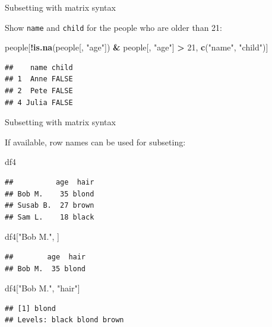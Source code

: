 \documentclass[ignorenonframetext,]{beamer}
\newenvironment{Shaded}{\begin{snugshade}}{\end{snugshade}}
\newcommand{\DecValTok}[1]{\textcolor[rgb]{0.00,0.00,0.81}{#1}}
\newcommand{\KeywordTok}[1]{\textcolor[rgb]{0.13,0.29,0.53}{\textbf{#1}}}
\newcommand{\NormalTok}[1]{#1}
\newcommand{\OperatorTok}[1]{\textcolor[rgb]{0.81,0.36,0.00}{\textbf{#1}}}
\newcommand{\StringTok}[1]{\textcolor[rgb]{0.31,0.60,0.02}{#1}}
\begin{document}
\begin{frame}[fragile]{Subsetting with matrix syntax}
\protect\hypertarget{subsetting-with-matrix-syntax-5}{}

Show \texttt{name} and \texttt{child} for the people who are older than
21:

\begin{Shaded}
\begin{Highlighting}[]
\NormalTok{people[}\OperatorTok{!}\KeywordTok{is.na}\NormalTok{(people[, }\StringTok{"age"}\NormalTok{]) }\OperatorTok{&}\StringTok{ }\NormalTok{people[, }\StringTok{"age"}\NormalTok{] }\OperatorTok{>}\StringTok{ }\DecValTok{21}\NormalTok{,}
       \KeywordTok{c}\NormalTok{(}\StringTok{"name"}\NormalTok{, }\StringTok{"child"}\NormalTok{)]}
\end{Highlighting}
\end{Shaded}

\begin{verbatim}
##    name child
## 1  Anne FALSE
## 2  Pete FALSE
## 4 Julia FALSE
\end{verbatim}

\end{frame}

\begin{frame}[fragile]{Subsetting with matrix syntax}
\protect\hypertarget{subsetting-with-matrix-syntax-6}{}

If available, row names can be used for subseting:

\begin{Shaded}
\begin{Highlighting}[]
\NormalTok{df4}
\end{Highlighting}
\end{Shaded}

\begin{verbatim}
##          age  hair
## Bob M.    35 blond
## Susab B.  27 brown
## Sam L.    18 black
\end{verbatim}

\begin{Shaded}
\begin{Highlighting}[]
\NormalTok{df4[}\StringTok{"Bob M."}\NormalTok{, ]}
\end{Highlighting}
\end{Shaded}

\begin{verbatim}
##        age  hair
## Bob M.  35 blond
\end{verbatim}

\begin{Shaded}
\begin{Highlighting}[]
\NormalTok{df4[}\StringTok{"Bob M."}\NormalTok{, }\StringTok{"hair"}\NormalTok{]}
\end{Highlighting}
\end{Shaded}

\begin{verbatim}
## [1] blond
## Levels: black blond brown
\end{verbatim}

\end{frame}
\end{document}
